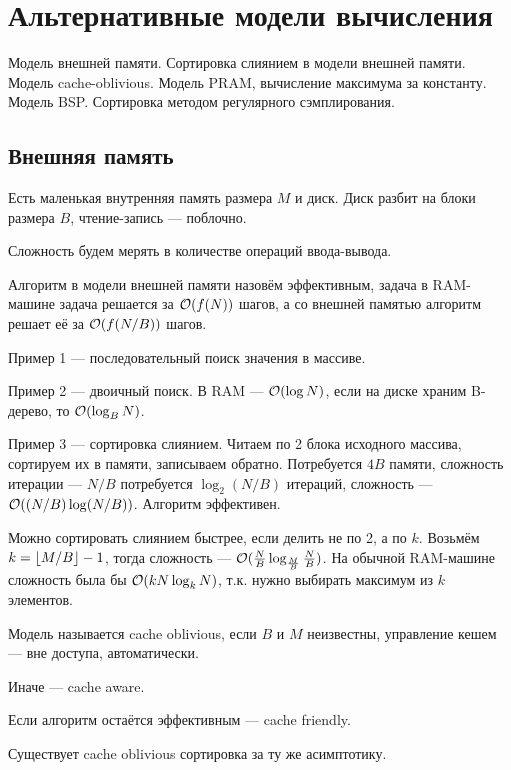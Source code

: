 \section{Альтернативные модели вычисления}
Модель внешней памяти.
Сортировка слиянием в модели внешней памяти.
Модель cache-oblivious.
Модель PRAM, вычисление максимума за константу.
Модель BSP.
Сортировка методом регулярного сэмплирования.

\subsection{Внешняя память}
Есть маленькая внутренняя память размера $M$ и диск.
Диск разбит на блоки размера $B$, чтение-запись --- поблочно.

Сложность будем мерять в количестве операций ввода-вывода.

Алгоритм в модели внешней памяти назовём эффективным,
задача в RAM-машине задача решается за $\mathcal{O}(f(N))$ шагов,
а со внешней памятью алгоритм решает её за $\mathcal{O}(f(N / B))$ шагов.

Пример 1 --- последовательный поиск значения в массиве.

Пример 2 --- двоичный поиск. В RAM --- $\mathcal{O}(\log N)$,
если на диске храним B-дерево, то $\mathcal{O}(\log_B N)$.

Пример 3 --- сортировка слиянием.
Читаем по 2 блока исходного массива,
сортируем их в памяти, записываем обратно.
Потребуется $4B$ памяти,
сложность итерации --- $N / B$
потребуется $\log_2 (N / B)$ итераций,
сложность --- $\mathcal{O}((N/B) \log (N/B))$.
Алгоритм эффективен.

Можно сортировать слиянием быстрее,
если делить не по 2, а по $k$.
Возьмём $k = \left \lfloor M / B \right \rfloor - 1$,
тогда сложность --- $\mathcal{O}(\frac{N}{B} \log_{\frac{M}{B}} \frac{N}{B})$.
На обычной RAM-машине сложность была бы
$\mathcal{O}(k N \log_k N)$,
т.к. нужно выбирать максимум из $k$ элементов.

\begin{definition}
    Модель называется cache oblivious,
    если $B$ и $M$ неизвестны,
    управление кешем --- вне доступа, автоматически.
\end{definition}
\begin{definition}
    Иначе --- cache aware.
\end{definition}
\begin{definition}
    Если алгоритм остаётся эффективным --- cache friendly.
\end{definition}

Существует cache oblivious сортировка за ту же асимптотику.

